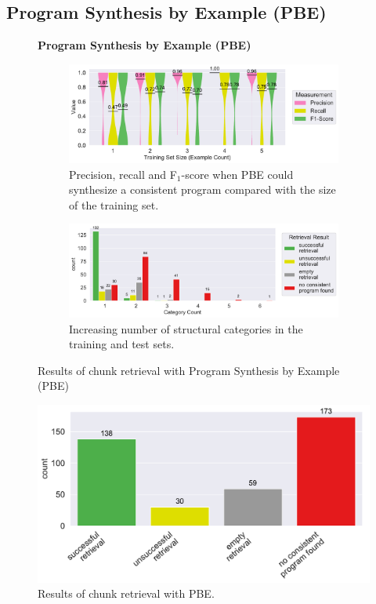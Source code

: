 \subsection{Program Synthesis by Example (PBE)}
\label{sec:r:pbe}
\begin{figure}
\centering
    \textbf{Program Synthesis by Example (PBE)}\par\medskip
\begin{subfigure}[b]{\columnwidth}
		\centering
		\includegraphics[width=\columnwidth,
		clip]{img/big-study/recall-precision-examplecount-sythesisworked-PBE.pdf}
				\caption{Precision, recall and
				F$_{1}$-score when PBE could synthesize
				a consistent program compared with the
				size of the training set.}
		\label{fig:recall-precision-examplecount-sythesisworked-PBE}
\end{subfigure}\hspace{\fill}
\begin{subfigure}[b]{\columnwidth}
		\centering
		\includegraphics[width=\columnwidth,
		clip]{img/big-study/failure-reason-categorycount-PBE.pdf}
				\caption{Increasing number of structural
				categories in the training and test sets.}
		\label{fig:failure-reason-categorycount-PBE}
\end{subfigure}
\caption{Results of chunk retrieval with  Program Synthesis by Example
(PBE)}
\end{figure}


\begin{figure}[tbp]
		\centering
		\includegraphics[width=0.75\columnwidth,
		clip]{img/big-study/failure-reason-pbe.pdf}
		\caption{Results of chunk retrieval with PBE.}
		\label{fig:failure-reason-PBE}
\end{figure}

